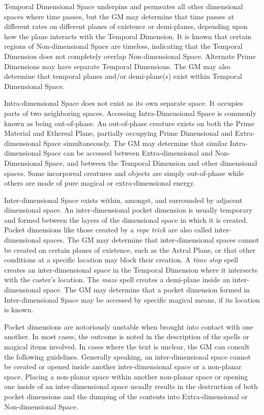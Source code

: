 \begin{multicols}{2}
Temporal Dimensional Space underpins and permeates all other dimensional spaces where time passes, but the GM may determine that time passes at different rates on different planes of existence or demi-planes, depending upon how the plane interacts with the Temporal Dimension.  It is known that certain regions of Non-dimensional Space are timeless, indicating that the Temporal Dimension does not completely overlap Non-dimensional Space.  Alternate Prime Dimensions may have separate Temporal Dimensions.  The GM may also determine that temporal planes and/or demi-plane(s) exist within Temporal Dimensional Space.

Intra-dimensional Space does not exist as its own separate space.  It occupies parts of two neighboring spaces.  Accessing Intra-Dimensional Space is commonly known as being out-of-phase.  An out-of-phase creature exists on both the Prime Material and Ethereal Plane, partially occupying Prime Dimensional and Extra-dimensional Space simultaneously.  The GM may determine that similar Intra-dimensional Space can be accessed between Extra-dimensional and Non-Dimensional Space, and between the Temporal Dimension and other dimensional spaces.  Some incorporeal creatures and objects are simply out-of-phase while others are made of pure magical or extra-dimensional energy.
 
Inter-dimensional Space exists within, amongst, and surrounded by adjacent dimensional space.  An inter-dimensional pocket dimension is usually temporary and formed between the layers of the dimensional space in which it is created.  Pocket dimensions like those created by a \textit{rope trick} are also called inter-dimensional spaces.  The GM may determine that inter-dimensional spaces cannot be created on certain planes of existence, such as the Astral Plane, or that other conditions at a specific location may block their creation.  A \textit{time stop} spell creates an inter-dimensional space in the Temporal Dimension where it intersects with the caster's location.  The \textit{maze} spell creates a demi-plane inside an inter-dimensional space.  The GM may determine that a pocket dimension formed in Inter-dimensional Space may be accessed by specific magical means, if its location is known.

Pocket dimensions are notoriously unstable when brought into contact with one another.  In most cases, the outcome is noted in the description of the spells or magical items involved.  In cases where the text is unclear, the GM can consult the following guidelines.  Generally speaking, an inter-dimensional space cannot be created or opened inside another inter-dimensional space or a non-planar space.  Placing a non-planar space within another non-planar space or opening one inside of an inter-dimensional space usually results in the destruction of both pocket dimensions and the dumping of the contents into Extra-dimensional or Non-dimensional Space.


\end{multicols}
